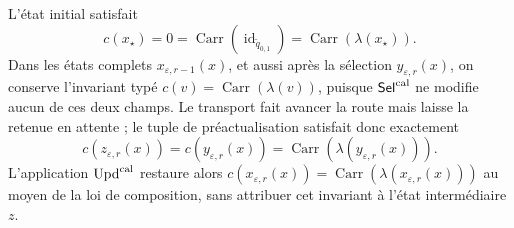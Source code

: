 L'état initial satisfait
\[
 c(x_\star)=0=\operatorname{Carr}
   (\operatorname{id}_{\widetilde q_{0,1}})
   =\operatorname{Carr}(\lambda(x_\star)).
\]
Dans les états complets \(x_{\varepsilon,r-1}(x)\), et aussi après la
sélection \(y_{\varepsilon,r}(x)\), on conserve l’invariant typé
\(c(v)=\operatorname{Carr}(\lambda(v))\), puisque
\(\mathsf{Sel}^{\rm cal}\) ne modifie aucun de ces deux champs. Le
transport fait avancer la route mais laisse la retenue en attente ; le tuple de
préactualisation satisfait donc exactement
\[
 c(z_{\varepsilon,r}(x))=c(y_{\varepsilon,r}(x))
 =\operatorname{Carr}(\lambda(y_{\varepsilon,r}(x))).
\]
L'application \(\operatorname{Upd}^{\rm cal}\) restaure alors \(c(x_{\varepsilon,r}(x))=
\operatorname{Carr}(\lambda(x_{\varepsilon,r}(x)))\) au moyen de la loi de composition, sans attribuer cet invariant à l'état intermédiaire \(z\).

